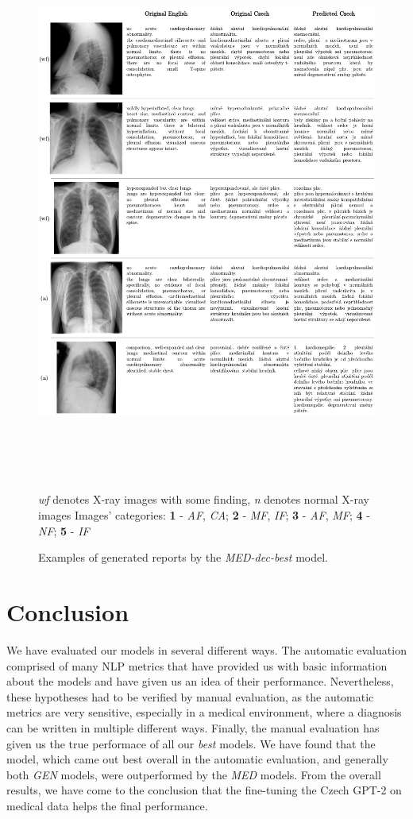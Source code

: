 \begin{figure}[h]\centering
\includegraphics[width=145mm, height=177.5mm]{../img/Examples2}
\caption{Examples of generated reports by the \textit{MED-dec-best} model.}
\label{fig02:Examples2}
\textit{wf} denotes X-ray images with some finding, \textit{n} denotes normal X-ray images
Images' categories:
\textbf{1} - \textit{AF}, \textit{CA};
\textbf{2} - \textit{MF}, \textit{IF};
\textbf{3} - \textit{AF}, \textit{MF};
\textbf{4} - \textit{NF};
\textbf{5} - \textit{IF}
\end{figure}

\section{Conclusion}
We have evaluated our models in several different ways. The automatic evaluation comprised of many NLP metrics that have provided us with basic information about the models and have given us an idea of their performance. Nevertheless, these hypotheses had to be verified by manual evaluation, as the automatic metrics are very sensitive, especially in a medical environment, where a diagnosis can be written in multiple different ways. Finally, the manual evaluation has given us the true performace of all our \textit{best} models. We have found that the model, which came out best overall in the automatic evaluation, and generally both \textit{GEN} models, were outperformed by the \textit{MED} models. From the overall results, we have come to the conclusion that the fine-tuning the Czech GPT-2 on medical data helps the final performance.





